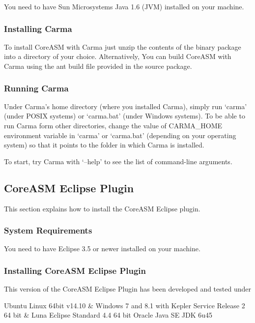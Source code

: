 \documentclass{article}
\newcommand{\CoreASM}{{\sffamily CoreASM}\xspace}
\newcommand{\Carma}{{\sffamily Carma}\xspace}
\begin{document}
You need to have Sun Microsystems Java 1.6 (JVM) installed on your machine.

\subsubsection{Installing \Carma}

To install \CoreASM with \Carma just unzip the contents of the binary package into a 
directory of your choice. Alternatively, You can build \CoreASM with \Carma using the 
ant build file provided in the source package.

\subsubsection{Running \Carma}

Under \Carma's home directory (where you installed Carma), 
simply run `carma' (under POSIX systems) or `carma.bat' (under Windows systems). 
To be able to run \Carma form other directories, change the value of {\ttfamily CARMA\_HOME} environment 
variable in `carma' or `carma.bat' (depending on your operating system) so that it points to the folder 
in which Carma is installed.

To start, try Carma with `{\ttfamily --help}' to see the list of command-line arguments. 

\subsection{\CoreASM Eclipse Plugin}

This section explains how to install the \CoreASM Eclipse plugin.

\subsubsection{System Requirements}

You need to have Eclipse 3.5 or newer installed on your machine.

\subsubsection{Installing \CoreASM Eclipse Plugin}

This version of the CoreASM Eclipse Plugin has been developed and tested under

	Ubuntu Linux 64bit v14.10 \&
	Windows 7 and 8.1
    with
    Kepler Service Release 2 64 bit \&
    Luna Eclipse Standard 4.4 64 bit
    Oracle Java SE JDK 6u45
\end{document}
